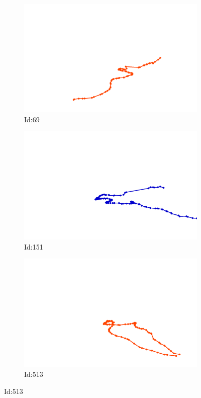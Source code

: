 \documentclass[12pt,twoside]{report}
\begin{document}
\begin{figure}
\centering
\begin{subfigure}[b]{0.20\textwidth}
\centering
\includegraphics[width=\textwidth]{../../trajectories/69.png}
\caption{Id:69}
\end{subfigure}
\begin{subfigure}[b]{0.20\textwidth}
\centering
\includegraphics[width=\textwidth]{../../trajectories/151.png}
\caption{Id:151}
\end{subfigure}
\begin{subfigure}[b]{0.20\textwidth}
\centering
\includegraphics[width=\textwidth]{../../trajectories/513.png}
\caption{Id:513}
\end{subfigure}
\end{figure}
\end{document}
